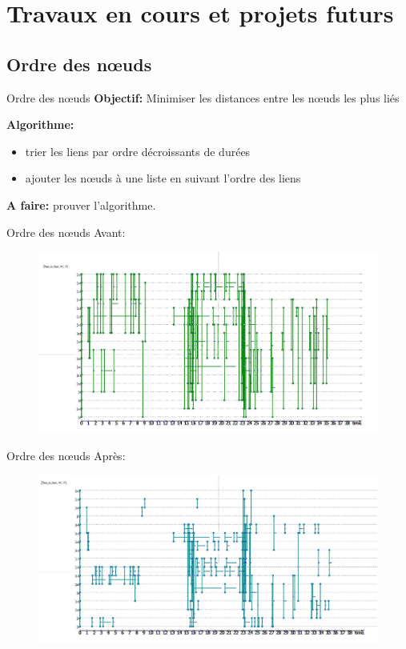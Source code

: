 \documentclass[15pt]{beamer}
\begin{document}
\section{Travaux en cours et projets futurs}
\subsection{Ordre des n\oe{}uds}
\begin{frame}{Ordre des n\oe{}uds}
    \textbf{Objectif:} Minimiser les distances entre les n\oe{}uds les plus \og liés \fg{}
    
    
    \textbf{Algorithme:} \begin{itemize}
        \item trier les liens par ordre décroissants de durées
        \item ajouter les n\oe{}uds à une liste en suivant l'ordre des liens
    \end{itemize}
    
    \textbf{A faire:} prouver l'algorithme.
\end{frame}

\begin{frame}{Ordre des n\oe{}uds}
    Avant:
    
    \begin{figure}
        \centering
        \includegraphics[width=\textwidth]{img/nonordonne.JPG}
        \label{fig:my_label}
    \end{figure}
\end{frame}

\begin{frame}{Ordre des n\oe{}uds}
    Après: 
    
    \begin{figure}
        \centering
        \includegraphics[width=\textwidth]{img/ordonne.JPG}
        \label{fig:my_label}
    \end{figure}
\end{frame}
\end{document}
